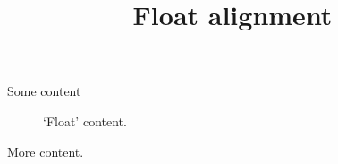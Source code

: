 \documentclass{ltx-talk}
\title{Float alignment}
\begin{document}
\begin{frame}
  Some content
  \begin{figure}
    `Float' content.
  \end{figure}
  More content.
\end{frame}
\end{document}
